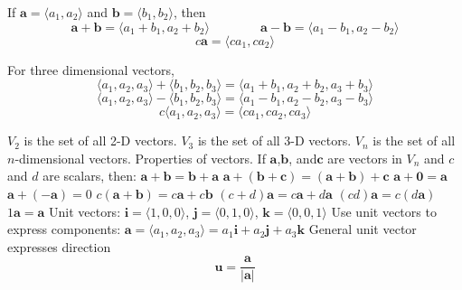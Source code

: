 \documentclass{article}
\begin{document}
    \begin{outline}
        \1 If \(\mathbf a=\langle a_1,a_2\rangle\) and \(\mathbf b=\langle b_1,b_2\rangle\), then \[\mathbf a+\mathbf b=\langle a_1+b_1,a_2+b_2\rangle\qquad\qquad\mathbf a-\mathbf b=\langle a_1-b_1,a_2-b_2\rangle\]\[c\mathbf a=\langle ca_1,ca_2\rangle \]
    
        \1 For three dimensional vectors, \[\langle a_1,a_2,a_3\rangle+\langle b_1, b_2,b_3\rangle=\langle a_1+b_1, a_2+b_2,a_3+b_3\rangle\]\[\langle a_1,a_2,a_3\rangle-\langle b_1, b_2,b_3\rangle=\langle a_1-b_1, a_2-b_2, a_3-b_3\rangle\]\[c\langle a_1,a_2,a_3\rangle=\langle ca_1,ca_2,ca_3\rangle\]
        \end{outline}\begin{outline}
        \1 \(V_2\) is the set of all 2-D vectors. \(V_3\) is the set of all 3-D vectors. \(V_n\) is the set of all $n$-dimensional vectors. 
        \1 Properties of vectors. If \(\mathbf a\),\(\mathbf{b}\), and\(\mathbf c\) are vectors in \(V_n\) and $c$ and $d$ are scalars, then: 
            \2 \(\mathbf a+\mathbf b=\mathbf b+\mathbf a\)
            \2 \(\mathbf a+(\mathbf b+\mathbf c)=(\mathbf a+\mathbf b)+\mathbf c\)
            \2 \(\mathbf a+\mathbf 0=\mathbf a\)
            \2 \(\mathbf a+(-\mathbf a)=0\)
            \2 \(c(\mathbf a+\mathbf b)=c\mathbf a+c\mathbf b\)
            \2 \((c+d)\mathbf a=c\mathbf a+d\mathbf a\)
            \2 \((cd)\mathbf a=c(d\mathbf a)\)
            \2 \(1\mathbf a=\mathbf a\)
        \1 Unit vectors: \(\mathbf i=\langle 1,0,0\rangle\), \(\mathbf j=\langle 0,1,0\rangle\), \(\mathbf k=\langle 0,0,1\rangle\)
        \1 Use unit vectors to express components: \(\mathbf a=\langle a_1,a_2,a_3\rangle=a_1\mathbf i+a_2\mathbf j+a_3\mathbf k\)
        \1 General unit vector expresses direction \[\mathbf u=\dfrac{\mathbf a}{|\mathbf a|}\]
        

    \end{outline}
\end{document}
